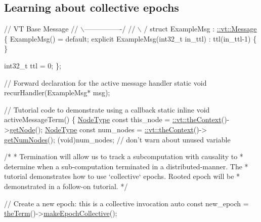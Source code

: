 \hypertarget{tutorial-3a}{}\subsection{Learning about collective epochs}\label{tutorial-3a}

\begin{DoxyCodeInclude}
\textcolor{comment}{//              VT Base Message}
\textcolor{comment}{//             \(\backslash\)----------------/}
\textcolor{comment}{//              \(\backslash\)              /}
\textcolor{keyword}{struct }ExampleMsg : \hyperlink{structvt_1_1messaging_1_1_active_msg}{::vt::Message} \{
  ExampleMsg() = \textcolor{keywordflow}{default};
  \textcolor{keyword}{explicit} ExampleMsg(int32\_t in\_ttl) : ttl(in\_ttl-1) \{ \}

  int32\_t ttl = 0;
\};

\textcolor{comment}{// Forward declaration for the active message handler}
\textcolor{keyword}{static} \textcolor{keywordtype}{void} recurHandler(ExampleMsg* msg);

\textcolor{comment}{// Tutorial code to demonstrate using a callback}
\textcolor{keyword}{static} \textcolor{keyword}{inline} \textcolor{keywordtype}{void} activeMessageTerm() \{
  \hyperlink{namespacevt_a866da9d0efc19c0a1ce79e9e492f47e2}{NodeType} \textcolor{keyword}{const} this\_node = \hyperlink{namespacevt_a26551fe0e6e6a1371111df5b12c7e92c}{::vt::theContext}()->\hyperlink{structvt_1_1ctx_1_1_context_a0d52c263ce8516546a67443d9a86fa5f}{getNode}();
  \hyperlink{namespacevt_a866da9d0efc19c0a1ce79e9e492f47e2}{NodeType} \textcolor{keyword}{const} num\_nodes = \hyperlink{namespacevt_a26551fe0e6e6a1371111df5b12c7e92c}{::vt::theContext}()->
      \hyperlink{structvt_1_1ctx_1_1_context_a7f41071aadf6d5fa9e1b6c703c5ff19d}{getNumNodes}();
  (void)num\_nodes;  \textcolor{comment}{// don't warn about unused variable}

  \textcolor{comment}{/*}
\textcolor{comment}{   * Termination will allow us to track a subcomputation with causality to}
\textcolor{comment}{   * determine when a sub-computation terminated in a distributed-manner. The}
\textcolor{comment}{   * tutorial demonstrates how to use `collective` epochs. Rooted epoch will be}
\textcolor{comment}{   * demonstrated in a follow-on tutorial.}
\textcolor{comment}{   */}

  \textcolor{comment}{// Create a new epoch: this is a collective invocation}
  \textcolor{keyword}{auto} \textcolor{keyword}{const} new\_epoch = \hyperlink{namespacevt_a127580fdfcaba0b4171e5c48c5676733}{theTerm}()->\hyperlink{structvt_1_1term_1_1_termination_detector_a748dfa37925107b37bde702e6c5f4aa4}{makeEpochCollective}();


\end{DoxyCodeInclude}
